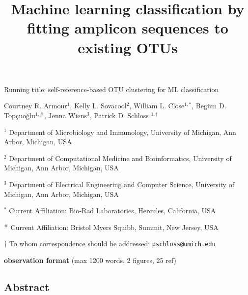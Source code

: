 \documentclass[
]{article}
\title{\textbf{Machine learning classification by fitting amplicon
sequences to existing OTUs}}
\author{}
\date{\vspace{-2.5em}}
\begin{document}
\maketitle

Running title: self-reference-based OTU clustering for ML classification

\vspace{10mm}

Courtney R. Armour\({^1}\), Kelly L. Sovacool\({^2}\), William L.
Close\(^{1,*}\), Begüm D. Topçuoğlu\(^{1,\#}\), Jenna Wiens\({^3}\),
Patrick D. Schloss \(^{1,\dagger}\)

\vspace{10mm}

\({^1}\) Department of Microbiology and Immunology, University of
Michigan, Ann Arbor, Michigan, USA

\({^2}\) Department of Computational Medicine and Bioinformatics,
University of Michigan, Ann Arbor, Michigan, USA

\({^3}\) Department of Electrical Engineering and Computer Science,
University of Michigan, Ann Arbor, Michigan, USA

\({^*}\) Current Affiliation: Bio-Rad Laboratories, Hercules,
California, USA

\({^\#}\) Current Affiliation: Bristol Myers Squibb, Summit, New Jersey,
USA

\(\dagger\) To whom correspondence should be addressed:
\href{mailto:pschloss@umich.edu}{\nolinkurl{pschloss@umich.edu}}

\vspace{10mm}

\textbf{observation format} (max 1200 words, 2 figures, 25 ref)

\newpage

\linenumbers

\hypertarget{abstract}{%
\subsection{Abstract}\label{abstract}}
\end{document}
